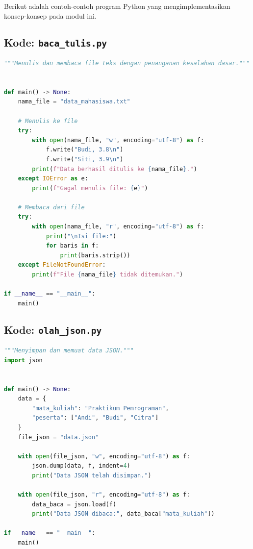 \documentclass[../main.tex]{subfiles}
\begin{document}
Berikut adalah contoh-contoh program Python yang mengimplementasikan konsep-konsep pada modul ini.

\subsection{Kode: \texttt{baca\_tulis.py}}
\begin{lstlisting}[language=Python,caption={\texttt{baca\_tulis.py}}]
"""Menulis dan membaca file teks dengan penanganan kesalahan dasar."""


def main() -> None:
    nama_file = "data_mahasiswa.txt"
    
    # Menulis ke file
    try:
        with open(nama_file, "w", encoding="utf-8") as f:
            f.write("Budi, 3.8\n")
            f.write("Siti, 3.9\n")
        print(f"Data berhasil ditulis ke {nama_file}.")
    except IOError as e:
        print(f"Gagal menulis file: {e}")

    # Membaca dari file
    try:
        with open(nama_file, "r", encoding="utf-8") as f:
            print("\nIsi file:")
            for baris in f:
                print(baris.strip())
    except FileNotFoundError:
        print(f"File {nama_file} tidak ditemukan.")

if __name__ == "__main__":
    main()
\end{lstlisting}

\subsection{Kode: \texttt{olah\_json.py}}
\begin{lstlisting}[language=Python,caption={\texttt{olah\_json.py}}]
"""Menyimpan dan memuat data JSON."""
import json


def main() -> None:
    data = {
        "mata_kuliah": "Praktikum Pemrograman",
        "peserta": ["Andi", "Budi", "Citra"]
    }
    file_json = "data.json"
    
    with open(file_json, "w", encoding="utf-8") as f:
        json.dump(data, f, indent=4)
        print("Data JSON telah disimpan.")
        
    with open(file_json, "r", encoding="utf-8") as f:
        data_baca = json.load(f)
        print("Data JSON dibaca:", data_baca["mata_kuliah"])

if __name__ == "__main__":
    main()
\end{lstlisting}
\end{document}
